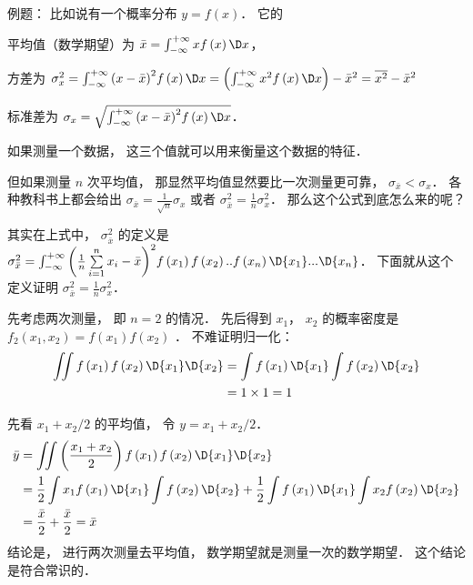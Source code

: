 
例题： 比如说有一个概率分布 $y = f\left( x \right)$．  它的

平均值（数学期望）为 $\bar x = \int_{ - \infty }^{ + \infty } {xf\left( x \right)\D x} $，  

方差为  $\sigma_x^2 = \int_{ - \infty }^{ + \infty } {{{\left( {x - \bar x} \right)}^2}f\left( x \right)\D x}  = \left( {\int_{ - \infty }^{ + \infty } {{x^2}f\left( x \right)\D x} } \right) - {\bar x^2} = \overline {{x^2}}  - {\bar x^2}$ 

标准差为 ${\sigma_x} = \sqrt {\int_{ - \infty }^{ + \infty } {{{\left( {x - \bar x} \right)}^2}f\left( x \right)\D x} } $．  

如果测量一个数据， 这三个值就可以用来衡量这个数据的特征．

但如果测量 $n$ 次平均值， 那显然平均值显然要比一次测量更可靠， ${\sigma_{\bar x}} < {\sigma_x}$．   各种教科书上都会给出 ${\sigma_{\bar x}} = \frac{1}{{\sqrt n }}{\sigma_x}$ 或者 $\sigma_{\bar x}^2 = \frac{1}{n}\sigma_x^2$．  那么这个公式到底怎么来的呢？

其实在上式中， $\sigma_{\bar x}^2$  的定义是 $\sigma_{\bar x}^2 = \int_{ - \infty }^{ + \infty } {{{\left( {\frac{1}{n}\sum\limits_{i = 1}^n {{x_i}}  - \bar x} \right)}^2}f\left( {{x_1}} \right)f\left( {{x_2}} \right)..f\left( {{x_n}} \right)\D {x_1}...\D {x_n}} $．  下面就从这个定义证明 $\sigma_{\bar x}^2 = \frac{1}{n}\sigma_x^2$． 

先考虑两次测量， 即 $n = 2$ 的情况． 先后得到 ${x_1}$，  ${x_2}$ 的概率密度是 ${f_2}\left( {{x_1},{x_2}} \right) = f\left( {{x_1}} \right)f\left( {{x_2}} \right)$ 
．  不难证明归一化：
 \begin{equation}
\begin{aligned}
  \iint {f\left( {{x_1}} \right)f\left( {{x_2}} \right)\D {x_1}\D {x_2}} &= \int {f\left( {{x_1}} \right)\D {x_1}} \int {f\left( {{x_2}} \right)\D {x_2}}  \hfill \\
   &= 1 \times 1 = 1 \hfill \\ 
\end{aligned}
\end{equation}

先看 ${{{x_1} + {x_2}}}/{2}$ 的平均值， 令 $y = {{{x_1} + {x_2}}}/{2}$． 
  \begin{equation}
\begin{aligned}
  \bar y &= \iint {\left( {\frac{{{x_1} + {x_2}}}{2}} \right)f\left( {{x_1}} \right)f\left( {{x_2}} \right)\D {x_1}\D {x_2}} \hfill \\
  & = \frac{1}{2}\int {{x_1}f\left( {{x_1}} \right)\D {x_1}} \int {f\left( {{x_2}} \right)\D {x_2}}  + \frac{1}{2}\int {f\left( {{x_1}} \right)\D {x_1}} \int {{x_2}f\left( {{x_2}} \right)\D {x_2}}  \hfill \\
   &= \frac{{\bar x}}{2} + \frac{{\bar x}}{2} = \bar x \hfill \\ 
\end{aligned} 
\end{equation}
结论是， 进行两次测量去平均值， 数学期望就是测量一次的数学期望． 这个结论是符合常识的．

